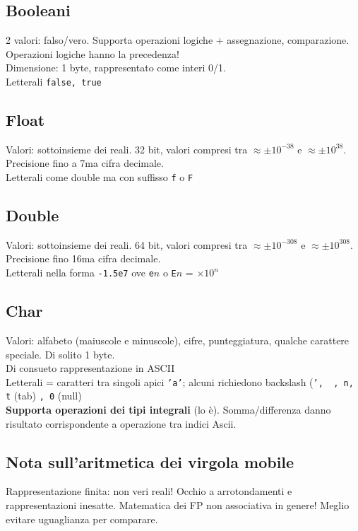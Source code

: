 \documentclass[10pt, oneside]{book}
\begin{document}
\subsection{Booleani}
2 valori: falso/vero. Supporta operazioni logiche + assegnazione, comparazione. Operazioni logiche hanno la precedenza!\\
Dimensione: 1 byte, rappresentato come interi 0/1.\\
Letterali \texttt{false, true}

\subsection{Float}
Valori: sottoinsieme dei reali. 32 bit, valori compresi tra $\approx \pm 10^{-38}$ e $\approx \pm 10^{38}$. Precisione fino a 7ma cifra decimale.\\
Letterali come double ma con suffisso \texttt{f} o \texttt{F}

\subsection{Double}
Valori: sottoinsieme dei reali. 64 bit, valori compresi tra $\approx \pm 10^{-308}$ e $\approx \pm 10^{308}$. Precisione fino 16ma cifra decimale.\\
Letterali nella forma \texttt{-1.5e7} ove \texttt{e}$n$ o \texttt{E}$n$ = $\times 10^n$

\subsection{Char}
Valori: alfabeto (maiuscole e minuscole), cifre, punteggiatura, qualche carattere speciale. Di solito 1 byte.\\
Di consueto rappresentazione in ASCII\\
Letterali = caratteri tra singoli apici \texttt{'a'}; alcuni richiedono backslash (\texttt{', \ , n, t} (tab) \texttt{, 0} (null)\\
\textbf{Supporta operazioni dei tipi integrali} (lo è). Somma/differenza danno risultato corrispondente a operazione tra indici Ascii.

\subsection{Nota sull'aritmetica dei virgola mobile}
Rappresentazione finita: non veri reali! Occhio a arrotondamenti e rappresentazioni inesatte. Matematica dei FP non associativa in genere! Meglio evitare uguaglianza per comparare.
\end{document}
